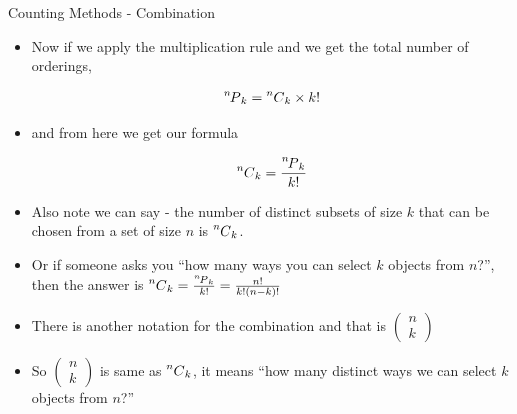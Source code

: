 \documentclass[8pt,usepdftitle=false]{beamer}
\begin{document}
\begin{frame}[allowframebreaks]{Counting Methods - Combination}
\begin{itemize}
\item Now if we apply the multiplication rule and we get the total number of orderings,


\begin{align*}
\Permute[n]{k} = \Combine[n]{k} \times k!
\end{align*}



\item and from here we get our formula

\begin{align*}
\Combine[n]{k}=\frac{\Permute[n]{k}}{k!}
\end{align*}

\framebreak

\item Also note we can say - the number of distinct subsets of size $k$ that can be chosen from a set of size $n$ is $\Combine[n]{k}$.

\item Or if someone asks you \alert{``how many ways you can select $k$ objects from $n$?''}, then the answer is  $\Combine[n]{k} = \frac{\Permute[n]{k}}{k!} = \frac{n !}{k !(n-k) !}$


\item There is another notation for the combination and that is $\left(\begin{array}{l}
n \\
k
\end{array}\right)$ 

\item So  $\left(\begin{array}{l}
n \\
k
\end{array}\right)$  is same as $\Combine[n]{k}$, it means \alert{``how many distinct ways we can select $k$ objects from $n$?''}



\end{itemize}


\end{frame}
\end{document}
